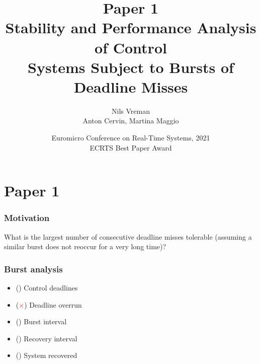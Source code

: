 \section{Paper 1}

\title[PhD Defence]{
    {\Huge Paper 1} \\
    \vspace{2mm}
    {\Large Stability and Performance Analysis of Control} \\
    {\Large Systems Subject to Bursts of Deadline Misses}
}
\author[Nils Vreman]{
    Nils Vreman \\
    \vspace{3mm}
    {\large Anton Cervin, Martina Maggio}
}
\date[ECRTS 2021]{
    Euromicro Conference on Real-Time Systems, 2021\\
    {\large ECRTS Best Paper Award}
}
\notitlelogo
{}

\begin{frame}
    \frametitle{Motivation}
    What is the largest number of consecutive deadline misses tolerable (\textcolor<2>{hicolour}{assuming a similar burst does not reoccur for a very long time})?~\parencite{Akesson:2020}
    \begin{figure}[h]
        \centering
         
    \end{figure}
\end{frame}

\begin{frame}
    \frametitle{Burst analysis}
    \vspace{-1mm}
    \begin{itemize} \setlength\itemsep{-1mm}
        \item () Control deadlines
        \item (\textcolor{red}{\textbf{$\mathbf{\times}$}}) Deadline overrun
        \item (\colorbox{red!15}{\phantom{i}}) Burst interval
        \item (\colorbox{green!15}{\phantom{i}}) Recovery interval
        \item (\textcolor{green!70!black}{\checkmark}) System recovered
    \end{itemize}

    \begin{figure}[h]
        \centering
    \end{figure}
\end{frame}

